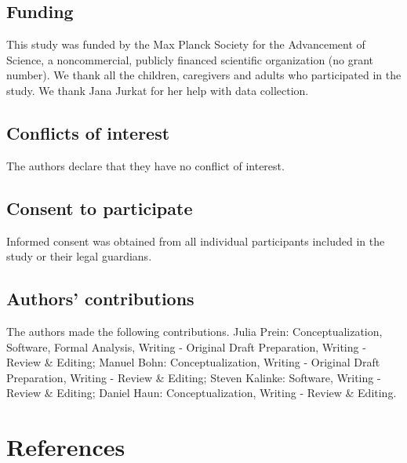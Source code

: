 \documentclass[
  man,floatsintext]{apa6}
\begin{document}
\hypertarget{funding}{%
\subsection{Funding}\label{funding}}

This study was funded by the Max Planck Society for the Advancement of Science, a noncommercial, publicly financed scientific organization (no grant number).
We thank all the children, caregivers and adults who participated in the study.
We thank Jana Jurkat for her help with data collection.

\hypertarget{conflicts-of-interest}{%
\subsection{Conflicts of interest}\label{conflicts-of-interest}}

The authors declare that they have no conflict of interest.

\hypertarget{consent-to-participate}{%
\subsection{Consent to participate}\label{consent-to-participate}}

Informed consent was obtained from all individual participants included in the study or their legal guardians.

\hypertarget{authors-contributions}{%
\subsection{Authors' contributions}\label{authors-contributions}}

The authors made the following contributions.
Julia Prein: Conceptualization, Software, Formal Analysis, Writing - Original Draft Preparation, Writing - Review \& Editing; Manuel Bohn: Conceptualization, Writing - Original Draft Preparation, Writing - Review \& Editing; Steven Kalinke: Software, Writing - Review \& Editing; Daniel Haun: Conceptualization, Writing - Review \& Editing.

\newpage

\hypertarget{references}{%
\section{References}\label{references}}

\begingroup
\setlength{\parindent}{-0.5in}
\setlength{\leftskip}{0.5in}
\end{document}
